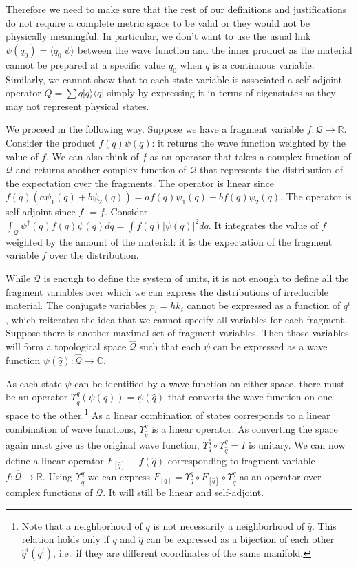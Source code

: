 \documentclass[smallextended]{svjour3}
\numberwithin{equation}{section}
\theoremstyle{definition}
\begin{document}
Therefore we need to make sure that the rest of our definitions and justifications do not require a complete metric space to be valid or they would not be physically meaningful. In particular, we don't want to use the usual link $\psi(q_0) = \langle q_0 | \psi \rangle$ between the wave function and the inner product as the material cannot be prepared at a specific value $q_0$ when $q$ is a continuous variable. Similarly, we cannot show that to each state variable is associated a self-adjoint operator $Q = \sum q |q\rangle \langle q |$ simply by expressing it in terms of eigenstates as they may not represent physical states.

We proceed in the following way. Suppose we have a fragment variable $f : \mathcal{Q} \rightarrow \mathbb{R}$. Consider the product $f (q) \psi (q)$: it returns the wave function weighted by the value of $f$. We can also think of $f$ as an operator that takes a complex function of $\mathcal{Q}$ and returns another complex function of $\mathcal{Q}$ that represents the distribution of the expectation over the fragments. The operator is linear since $f (q) (a\psi_1(q) + b\psi_2(q)) = a f(q) \psi_1(q) + b f(q)  \psi_2(q)$. The operator is self-adjoint since $f^\dagger = f$. Consider $\int_\mathcal{Q} \psi^\dagger (q) f(q) \psi(q) dq = \int f(q) | \psi(q)|^2 dq$. It integrates the value of $f$ weighted by the amount of the material: it is the expectation of the fragment variable $f$ over the distribution. 

While $\mathcal{Q}$ is enough to define the system of units, it is not enough to define all the fragment variables over which we can express the distributions of irreducible material. The conjugate variables $p_i=\hbar k_i$ cannot be expressed as a function of $q^i$, which reiterates the idea that we cannot specify all variables for each fragment. Suppose there is another maximal set of fragment variables. Then those variables will form a topological space $\hat{\mathcal{Q}}$ such that each $\psi$ can be expressed as a wave function $\psi(\hat{q}) :\hat{\mathcal{Q}} \rightarrow \mathbb{C}$.

As each state $\psi$ can be identified by a wave function on either space, there must be an operator $\Upsilon^q_{\hat{q}}(\psi(q)) = \psi(\hat{q})$ that converts the wave function on one space to the other.\footnote{Note that a neighborhood of $q$ is not necessarily a neighborhood of $\hat{q}$. This relation holds only if $q$ and $\hat{q}$ can be expressed as a bijection of each other $\hat{q}^i(q^i)$, i.e.~if they are different coordinates of the same manifold.} As a linear combination of states corresponds to a linear combination of wave functions, $\Upsilon^q_{\hat{q}}$ is a linear operator. As converting the space again must give us the original wave function, $\Upsilon^{\hat{q}}_{q} \circ \Upsilon^q_{\hat{q}}= I$ is unitary. We can now define a linear operator $F_{[\hat{q}]} \equiv f(\hat{q})$ corresponding to fragment variable $f : \hat{\mathcal{Q}} \rightarrow \mathbb{R}$. Using $\Upsilon^{q}_{\hat{q}}$ we can express $F_{[q]} = \Upsilon^{\hat{q}}_{q} \circ F_{[\hat{q}]} \circ  \Upsilon^{q}_{\hat{q}}$ as an operator over complex functions of $\mathcal{Q}$. It will still be linear and self-adjoint.
\end{document}
